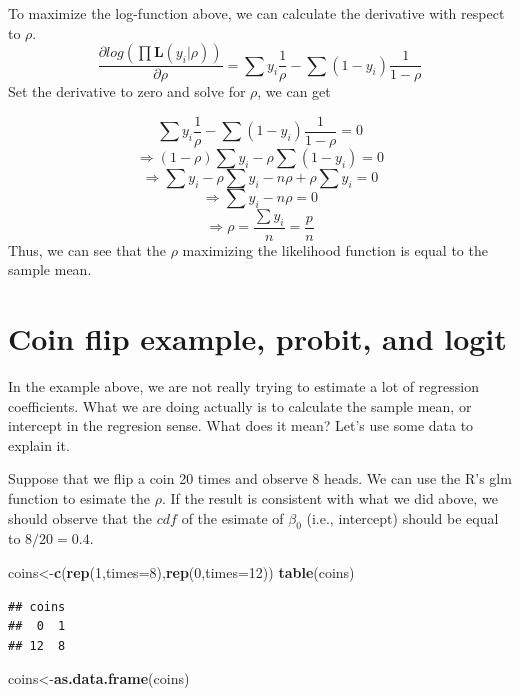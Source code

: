 \documentclass[
]{book}
\newenvironment{Shaded}{\begin{snugshade}}{\end{snugshade}}
\newcommand{\DataTypeTok}[1]{\textcolor[rgb]{0.13,0.29,0.53}{#1}}
\newcommand{\DecValTok}[1]{\textcolor[rgb]{0.00,0.00,0.81}{#1}}
\newcommand{\KeywordTok}[1]{\textcolor[rgb]{0.13,0.29,0.53}{\textbf{#1}}}
\newcommand{\NormalTok}[1]{#1}
\begin{document}
To maximize the log-function above, we can calculate the derivative with respect to \(\rho\).
\[\frac{\partial log (\prod \mathbf{L}(y_i|\rho)) }{\partial \rho}=\sum y_i \frac{1}{\rho}-\sum(1-y_i) \frac{1}{1-\rho}\]
Set the derivative to zero and solve for \(\rho\), we can get

\[\sum y_i \frac{1}{\rho}-\sum(1-y_i) \frac{1}{1-\rho}=0\]
\[\Rightarrow (1-\rho)\sum y_i - \rho \sum(1-y_i) =0\]
\[\Rightarrow \sum y_i-\rho\sum y_i - n\rho +\rho\sum y_i =0\]
\[\Rightarrow \sum y_i - n\rho  =0\]
\[\Rightarrow \rho  = \frac{\sum y_i}{n}=\frac{p}{n}\]
Thus, we can see that the \(\rho\) maximizing the likelihood function is equal to the sample mean.

\hypertarget{coin-flip-example-probit-and-logit}{%
\section{Coin flip example, probit, and logit}\label{coin-flip-example-probit-and-logit}}

In the example above, we are not really trying to estimate a lot of regression coefficients. What we are doing actually is to calculate the sample mean, or intercept in the regresion sense. What does it mean? Let's use some data to explain it.

Suppose that we flip a coin 20 times and observe 8 heads. We can use the R's glm function to esimate the \(\rho\). If the result is consistent with what we did above, we should observe that the \(cdf\) of the esimate of \(\beta_0\) (i.e., intercept) should be equal to \(8/20=0.4\).

\begin{Shaded}
\begin{Highlighting}[]
\NormalTok{coins<-}\KeywordTok{c}\NormalTok{(}\KeywordTok{rep}\NormalTok{(}\DecValTok{1}\NormalTok{,}\DataTypeTok{times=}\DecValTok{8}\NormalTok{),}\KeywordTok{rep}\NormalTok{(}\DecValTok{0}\NormalTok{,}\DataTypeTok{times=}\DecValTok{12}\NormalTok{))}
\KeywordTok{table}\NormalTok{(coins)}
\end{Highlighting}
\end{Shaded}

\begin{verbatim}
## coins
##  0  1 
## 12  8
\end{verbatim}

\begin{Shaded}
\begin{Highlighting}[]
\NormalTok{coins<-}\KeywordTok{as.data.frame}\NormalTok{(coins)}
\end{Highlighting}
\end{Shaded}
\end{document}
